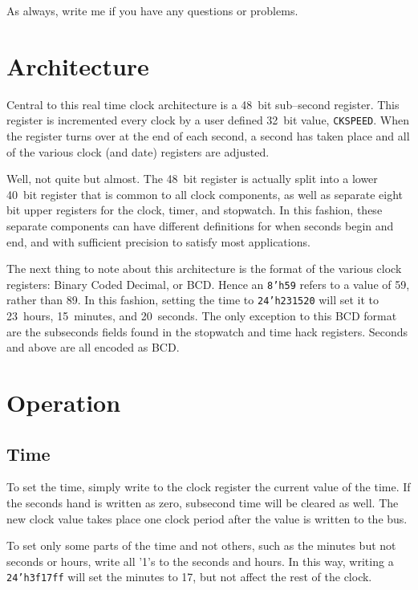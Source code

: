 \documentclass{gqtekspec}
\begin{document}
As always, write me if you have any questions or problems.

\chapter{Architecture}\label{chap:arch}

Central to this real time clock architecture is a 48~bit sub--second register.
This register is incremented every clock by a user defined 32~bit value,
{\tt CKSPEED}.  When the register turns over at the end of each second, a
second has taken place and all of the various clock (and date) registers are
adjusted.

Well, not quite but almost.  The 48~bit register is actually split into a
lower 40~bit register that is common to all clock components, as well as
separate eight bit upper registers for the clock, timer, and stopwatch.  In
this fashion, these separate components can have different definitions for
when seconds begin and end, and with sufficient precision to satisfy most
applications.

The next thing to note about this architecture is the format of the various
clock registers: Binary Coded Decimal, or BCD.  Hence an {\tt 8'h59} refers
to a value of 59, rather than 89.  In this fashion, setting the time to
{\tt 24'h231520} will set it to 23~hours, 15~minutes, and 20~seconds.  The
only exception to this BCD format are the subseconds fields found in the
stopwatch and time hack registers.  Seconds and above are all encoded as BCD.

\chapter{Operation}\label{chap:ops}

\section{Time}
To set the time, simply write to the clock register the current value of the
time.  If the seconds hand is written as zero, subsecond time will be cleared
as well.  The new clock value takes place one clock period after the value
is written to the bus.

To set only some parts of the time and not others, such as the minutes but
not seconds or hours, write all '1's to the seconds and hours.  In this way,
writing a {\tt 24'h3f17ff} will set the minutes to 17, but not affect the
rest of the clock.
\end{document}
